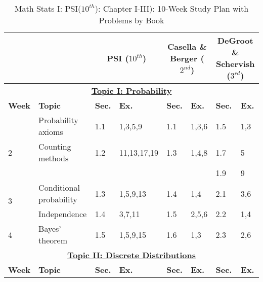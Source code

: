 \documentclass[12pt]{article}
\begin{document}
\begin{landscape}
\begin{table}[htbp]
\centering
\caption*{\small{Math Stats I: PSI}\footnotesize{($10^{th}$)}: \small{Chapter I-III): 10-Week Study Plan with Problems by Book}}


\begin{tabular}{%
    p{1.2cm}   %
    p{5cm}     %
    p{1cm}p{4cm}  %
    p{1cm}p{3.2cm}  %
    p{1cm}p{2.7cm}  %
}
\toprule
\multicolumn{2}{c}{} &%
\multicolumn{2}{c}{\hspace*{-2.5cm}\textbf{PSI} \footnotesize{($10^{th}$)}} &%
\multicolumn{2}{c}{\hspace*{-2cm}\textbf{Casella \& Berger} \footnotesize{($2^{nd}$)}} &%
\multicolumn{2}{c}{\hspace*{-1cm}\textbf{DeGroot \& Schervish} \footnotesize{($3^{rd}$)}}\\
\midrule
\multicolumn{8}{c}{\textbf{\underline{Topic I: Probability}}}\\[2pt]
\addlinespace
\textbf{Week}   &
\textbf{Topic}  &
\textbf{Sec.}   & \textbf{Ex.} &
\textbf{Sec.}   & \textbf{Ex.} &
\textbf{Sec.}   & \textbf{Ex.}\\
\midrule
\addlinespace
1   & Probability axioms        & 1.1   & 1,3,5,9       & 1.1       & 1,3,6     & 1.5       & 1,3\\[10pt]
2   & Counting methods          & 1.2   & 11,13,17,19   & 1.3       & 1,4,8     & 1.7       & 5\\[2pt]
    &                           &       &               &           &           & 1.9       & 9\\[10pt]
\multirow{2}{*}{3} &
    Conditional probability     & 1.3   & 1,5,9,13      & 1.4       & 1,4       & 2.1       & 3,6\\[2pt]
    & Independence              & 1.4   & 3,7,11        & 1.5       & 2,5,6     & 2.2       & 1,4\\[10pt]
4   & Bayes’ theorem            & 1.5   & 1,5,9,15      & 1.6       & 1,3       & 2.3       & 2,6\\[2pt]
\midrule
\multicolumn{8}{c}{\textbf{\underline{Topic II: Discrete Distributions}}}\\[2pt]
\addlinespace
\textbf{Week}   &
\textbf{Topic}  &
\textbf{Sec.}   & \textbf{Ex.} &
\textbf{Sec.}   & \textbf{Ex.} &
\textbf{Sec.}   & \textbf{Ex.}\\
\midrule
    

\end{tabular}
\end{table}
\end{landscape}
\end{document}
